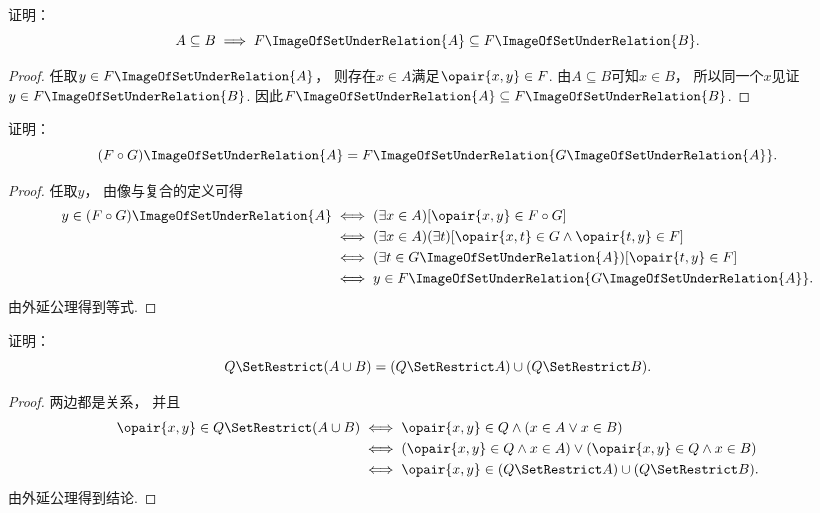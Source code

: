\begin{example}
    证明：
    \begin{equation}
        A \subseteq B \implies F\ImageOfSetUnderRelation{A} \subseteq F\ImageOfSetUnderRelation{B}.
    \end{equation}
    \begin{proof}
        任取\(y\in F\ImageOfSetUnderRelation{A}\)，
        则存在\(x\in A\)满足\(\opair{x,y}\in F\).
        由\(A\subseteq B\)可知\(x\in B\)，
        所以同一个\(x\)见证\(y\in F\ImageOfSetUnderRelation{B}\).
        因此\(F\ImageOfSetUnderRelation{A}\subseteq F\ImageOfSetUnderRelation{B}\).
    \end{proof}
\end{example}

\begin{example}
    证明：
    \begin{equation}
        (F \circ G)\ImageOfSetUnderRelation{A}
        = F\ImageOfSetUnderRelation{G\ImageOfSetUnderRelation{A}}.
    \end{equation}
    \begin{proof}
        任取\(y\)，
        由像与复合的定义可得
        \begin{align*}
            y\in(F\circ G)\ImageOfSetUnderRelation{A}
            &\iff(\exists x\in A)[\opair{x,y}\in F\circ G] \\
            &\iff(\exists x\in A)(\exists t)
            [\opair{x,t}\in G\land\opair{t,y}\in F] \\
            &\iff(\exists t\in G\ImageOfSetUnderRelation{A})[\opair{t,y}\in F] \\
            &\iff y\in F\ImageOfSetUnderRelation{G\ImageOfSetUnderRelation{A}}.
        \end{align*}
        由外延公理得到等式.
    \end{proof}
\end{example}

\begin{example}
    证明：
    \begin{equation}
        Q \SetRestrict (A \cup B)
        = (Q \SetRestrict A)\cup(Q \SetRestrict B).
    \end{equation}
    \begin{proof}
        两边都是关系，
        并且
        \begin{align*}
            \opair{x,y}\in Q\SetRestrict(A\cup B)
            &\iff\opair{x,y}\in Q\land(x\in A\lor x\in B) \\
            &\iff(\opair{x,y}\in Q\land x\in A)
            \lor(\opair{x,y}\in Q\land x\in B) \\
            &\iff\opair{x,y}\in(Q\SetRestrict A)\cup(Q\SetRestrict B).
        \end{align*}
        由外延公理得到结论.
    \end{proof}
\end{example}

